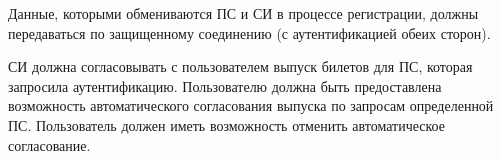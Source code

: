 
Данные, которыми обмениваются ПС и СИ в процессе регистрации, 
должны передаваться по защищенному соединению (с аутентификацией обеих сторон).


СИ должна согласовывать с пользователем выпуск билетов для ПС, которая 
запросила аутентификацию. 
%
Пользователю должна быть предоставлена возможность автоматического согласования 
выпуска по запросам определенной ПС.
%
Пользователь должен иметь возможность отменить автоматическое согласование.

% 
% 
